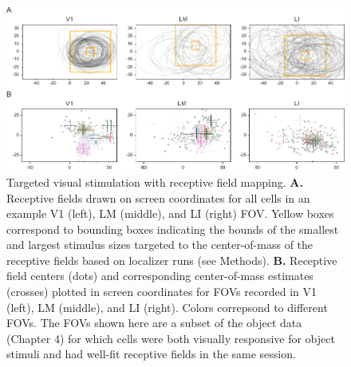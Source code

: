 \begin{figure}[hbt!]
\includegraphics[width=\textwidth]{figures/supplemental/fig_s5_vf_targeting/fig_s5_vf_targeting.pdf}
    \centering
    \caption[Visual field targeting]{Targeted visual stimulation with receptive field mapping.
    \textbf{A.} Receptive fields drawn on screen coordinates for all cells in an example V1 (left), LM (middle), and LI (right) FOV. Yellow boxes correspond to bounding boxes indicating the bounds of the smallest and largest stimulus sizes targeted to the center-of-mass of the receptive fields based on localizer runs (see Methods).
    \textbf{B.} Receptive field centers (dots) and corresponding center-of-mass estimates (crosses) plotted in screen coordinates for FOVs recorded in V1 (left), LM (middle), and LI (right). Colors correpsond to different FOVs. The FOVs shown here are a subset of the object data (Chapter 4) for which cells were both visually responsive for object stimuli and had well-fit receptive fields in the same session.
    \label{supfig:vf_targeting}}
\end{figure}


